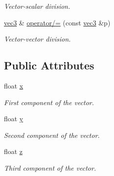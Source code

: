\begin{DoxyCompactItemize}
\begin{DoxyCompactList}\small\item\em Vector-\/scalar division. \end{DoxyCompactList}\item 
\mbox{\label{structphysim_1_1math_1_1vec3_a108b6acba8c350b958ce2fe2b94b831d}} 
\hyperlink{structphysim_1_1math_1_1vec3}{vec3} \& \hyperlink{structphysim_1_1math_1_1vec3_a108b6acba8c350b958ce2fe2b94b831d}{operator/=} (const \hyperlink{structphysim_1_1math_1_1vec3}{vec3} \&p)
\begin{DoxyCompactList}\small\item\em Vector-\/vector division. \end{DoxyCompactList}\end{DoxyCompactItemize}
\subsection*{Public Attributes}
\begin{DoxyCompactItemize}
\item 
\mbox{\label{structphysim_1_1math_1_1vec3_a1e6e6b869b8631d35d47f729d0e7b133}} 
float \hyperlink{structphysim_1_1math_1_1vec3_a1e6e6b869b8631d35d47f729d0e7b133}{x}
\begin{DoxyCompactList}\small\item\em First component of the vector. \end{DoxyCompactList}\item 
\mbox{\label{structphysim_1_1math_1_1vec3_a9d8e3bdd74443a7bc8cf45c85d1d008a}} 
float \hyperlink{structphysim_1_1math_1_1vec3_a9d8e3bdd74443a7bc8cf45c85d1d008a}{y}
\begin{DoxyCompactList}\small\item\em Second component of the vector. \end{DoxyCompactList}\item 
\mbox{\label{structphysim_1_1math_1_1vec3_a541880e43f1a7bd1b2c4524891a51727}} 
float \hyperlink{structphysim_1_1math_1_1vec3_a541880e43f1a7bd1b2c4524891a51727}{z}
\begin{DoxyCompactList}\small\item\em Third component of the vector. \end{DoxyCompactList}\end{DoxyCompactItemize}


